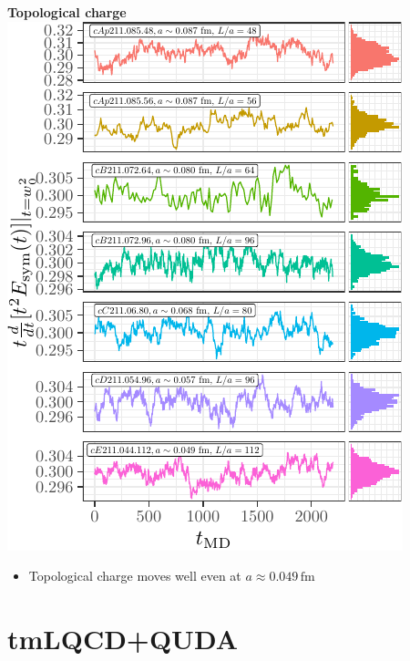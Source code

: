 \documentclass[a0,portrait]{a0poster}
\begin{document}
\begin{multicols}{2}
\begin{minipage}{0.48\linewidth}
      \centering
      \textbf{\hspace{3cm}Topological charge}\\
      \includegraphics[width=\linewidth,page=2]{data/gf_observables/gf_observables_md_histories}
      \begin{itemize}
        \item Topological charge moves well even at $a\approx 0.049 \, \mathrm{fm}$
      \end{itemize}
    \end{minipage}



    \section{tmLQCD+QUDA}


\end{multicols}
\end{document}
